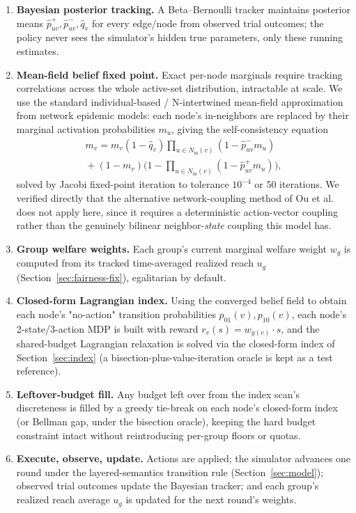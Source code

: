 \documentclass[journal]{IEEEtran}
\begin{document}
\begin{enumerate}
\item \textbf{Bayesian posterior tracking.} A Beta--Bernoulli tracker
  maintains posterior means $\hat p_{uv}^+, \hat p_{uv}^-, \hat q_v$ for
  every edge/node from observed trial outcomes; the policy never sees the
  simulator's hidden true parameters, only these running estimates.
\item \textbf{Mean-field belief fixed point.} Exact per-node marginals
  require tracking correlations across the whole active-set distribution,
  intractable at scale. We use the standard individual-based / N-intertwined
  mean-field approximation from network epidemic models: each node's
  in-neighbors are replaced by their marginal activation probabilities
  $m_u$, giving the self-consistency equation
  \begin{equation}
  \begin{split}
  m_v = m_v(1-\hat q_v)\!\!\prod_{u\in N_{\mathrm{in}}(v)}\!\!(1-\hat p^-_{uv}m_u) \\
  {}+(1-m_v)\Big(1-\!\!\prod_{u\in N_{\mathrm{in}}(v)}\!\!(1-\hat p^+_{uv}m_u)\Big),
  \end{split}
  \end{equation}
  solved by Jacobi fixed-point iteration to tolerance $10^{-4}$ or 50
  iterations. We verified directly that the alternative network-coupling
  method of Ou et al.~\cite{ou2022networked} does not apply here, since it
  requires a deterministic action-vector coupling rather than the
  genuinely bilinear neighbor-\emph{state} coupling this model has.
\item \textbf{Group welfare weights.} Each group's current marginal
  welfare weight $w_g$ is computed from its tracked time-averaged realized
  reach $u_g$ (Section~\ref{sec:fairness-fix}), egalitarian by default.
\item \textbf{Closed-form Lagrangian index.} Using the converged belief
  field to obtain each node's "no-action" transition probabilities
  $p_{01}(v), p_{10}(v)$, each node's 2-state/3-action MDP is built with
  reward $r_v(s)=w_{g(v)}\cdot s$, and the shared-budget Lagrangian
  relaxation is solved via the closed-form index of
  Section~\ref{sec:index} (a bisection-plus-value-iteration oracle is kept
  as a test reference).
\item \textbf{Leftover-budget fill.} Any budget left over from the index
  scan's discreteness is filled by a greedy tie-break on each node's
  closed-form index (or Bellman gap, under the bisection oracle), keeping
  the hard budget constraint intact without reintroducing per-group floors
  or quotas.
\item \textbf{Execute, observe, update.} Actions are applied; the simulator
  advances one round under the layered-semantics transition rule
  (Section~\ref{sec:model}); observed trial outcomes update the Bayesian
  tracker; and each group's realized reach average $u_g$ is updated for the
  next round's weights.
\end{enumerate}
\end{document}
